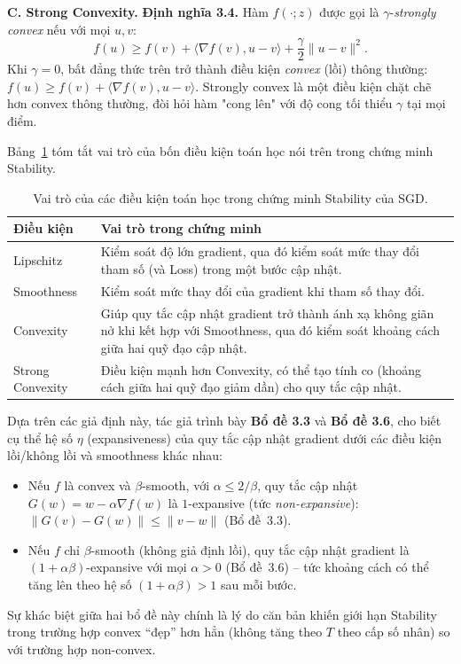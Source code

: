 \textbf{C. Strong Convexity.} \textbf{Định nghĩa 3.4.} Hàm $f(\cdot; z)$ được gọi là $\gamma$-\textit{strongly convex} nếu với mọi $u, v$:
\[
f(u) \geq f(v) + \langle \nabla f(v), u - v\rangle + \frac{\gamma}{2}\|u - v\|^2.
\]
Khi $\gamma = 0$, bất đẳng thức trên trở thành điều kiện \textit{convex} (lồi) thông thường: $f(u) \geq f(v) + \langle \nabla f(v), u-v\rangle$. Strongly convex là một điều kiện chặt chẽ hơn convex thông thường, đòi hỏi hàm "cong lên" với độ cong tối thiểu $\gamma$ tại mọi điểm.

Bảng~\ref{tab:vaitro-dieukien} tóm tắt vai trò của bốn điều kiện toán học nói trên trong chứng minh Stability.

\begin{table}[H]
\centering
\caption{Vai trò của các điều kiện toán học trong chứng minh Stability của SGD.}
\label{tab:vaitro-dieukien}
\begin{tabular}{|p{2.8cm}|p{9.4cm}|}
\hline
\textbf{Điều kiện} & \textbf{Vai trò trong chứng minh} \\ \hline
Lipschitz & Kiểm soát độ lớn gradient, qua đó kiểm soát mức thay đổi tham số (và Loss) trong một bước cập nhật. \\ \hline
Smoothness & Kiểm soát mức thay đổi của gradient khi tham số thay đổi. \\ \hline
Convexity & Giúp quy tắc cập nhật gradient trở thành ánh xạ không giãn nở khi kết hợp với Smoothness, qua đó kiểm soát khoảng cách giữa hai quỹ đạo cập nhật. \\ \hline
Strong Convexity & Điều kiện mạnh hơn Convexity, có thể tạo tính co (khoảng cách giữa hai quỹ đạo giảm dần) cho quy tắc cập nhật. \\ \hline
\end{tabular}
\end{table}

Dựa trên các giả định này, tác giả trình bày \textbf{Bổ đề 3.3} và \textbf{Bổ đề 3.6}, cho biết cụ thể hệ số $\eta$ (expansiveness) của quy tắc cập nhật gradient dưới các điều kiện lồi/không lồi và smoothness khác nhau:
\begin{itemize}
    \item Nếu $f$ là convex và $\beta$-smooth, với $\alpha \leq 2/\beta$, quy tắc cập nhật $G(w) = w - \alpha\nabla f(w)$ là $1$-expansive (tức \emph{non-expansive}): $\|G(v) - G(w)\| \leq \|v-w\|$ (Bổ đề~3.3).
    \item Nếu $f$ chỉ $\beta$-smooth (không giả định lồi), quy tắc cập nhật gradient là $(1+\alpha\beta)$-expansive với mọi $\alpha > 0$ (Bổ đề~3.6) -- tức khoảng cách có thể tăng lên theo hệ số $(1+\alpha\beta) > 1$ sau mỗi bước.
\end{itemize}
Sự khác biệt giữa hai bổ đề này chính là lý do căn bản khiến giới hạn Stability trong trường hợp convex ``đẹp'' hơn hẳn (không tăng theo $T$ theo cấp số nhân) so với trường hợp non-convex.

